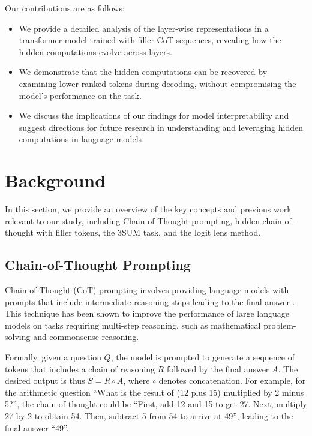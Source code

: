 \documentclass{article}
\begin{document}
Our contributions are as follows:

\begin{itemize}
    \item We provide a detailed analysis of the layer-wise representations in a transformer model trained with filler CoT sequences, revealing how the hidden computations evolve across layers.
    \item We demonstrate that the hidden computations can be recovered by examining lower-ranked tokens during decoding, without compromising the model's performance on the task.
    \item We discuss the implications of our findings for model interpretability and suggest directions for future research in understanding and leveraging hidden computations in language models.
\end{itemize}

\clearpage
\section{Background}

In this section, we provide an overview of the key concepts and previous work relevant to our study, including Chain-of-Thought prompting, hidden chain-of-thought with filler tokens, the 3SUM task, and the logit lens method.

\subsection{Chain-of-Thought Prompting}

Chain-of-Thought (CoT) prompting involves providing language models with prompts that include intermediate reasoning steps leading to the final answer \cite{wei2022chain}. This technique has been shown to improve the performance of large language models on tasks requiring multi-step reasoning, such as mathematical problem-solving and commonsense reasoning.

Formally, given a question $Q$, the model is prompted to generate a sequence of tokens that includes a chain of reasoning $R$ followed by the final answer $A$. The desired output is thus $S = R \circ A$, where $\circ$ denotes concatenation. For example, for the arithmetic question ``What is the result of (12 plus 15) multiplied by 2 minus 5?'', the chain of thought could be ``First, add 12 and 15 to get 27. Next, multiply 27 by 2 to obtain 54. Then, subtract 5 from 54 to arrive at 49'', leading to the final answer ``49''.
\end{document}
